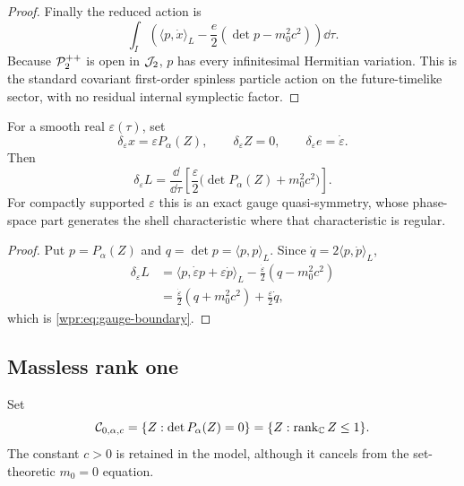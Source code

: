 \begin{proof}
Finally the reduced action is
\[
 \int_I\left(\langle p,\dot x\rangle_L
 -\frac e2(\det p-m_0^2c^2)\right)\dd\tau.
\]
Because \(\mathcal P_2^{++}\) is open in \(\mathcal J_2\), \(p\) has every infinitesimal
Hermitian variation.  This is the standard covariant first-order
spinless particle action on the future-timelike sector, with no
residual internal symplectic factor.
\end{proof}

\begin{proposition}
\label{wpr:prop:gauge}
For a smooth real \(\varepsilon(\tau)\), set
\[
 \delta_\varepsilon x=\varepsilon P_\alpha(Z),\qquad
 \delta_\varepsilon Z=0,\qquad
 \delta_\varepsilon e=\dot\varepsilon.
\]
Then
\begin{equation}
 \delta_\varepsilon L
 =
 \frac{\dd}{\dd\tau}
 \left[
 \frac{\varepsilon}{2}
 \bigl(\det P_\alpha(Z)+m_0^2c^2\bigr)
 \right].
 \label{wpr:eq:gauge-boundary}
\end{equation}
For compactly supported \(\varepsilon\) this is an exact gauge
quasi-symmetry, whose phase-space part generates the shell
characteristic where that characteristic is regular.
\end{proposition}
\begin{proof}
Put \(p=P_\alpha(Z)\) and \(q=\det p=\langle p,p\rangle_L\).  Since
\(\dot q=2\langle p,\dot p\rangle_L\),
\begin{align*}
 \delta_\varepsilon L
 &=
 \langle p,\dot\varepsilon p+\varepsilon\dot p\rangle_L
 -\frac{\dot\varepsilon}{2}(q-m_0^2c^2)\\
 &=
 \frac{\dot\varepsilon}{2}(q+m_0^2c^2)
 +\frac{\varepsilon}{2}\dot q,
\end{align*}
which is \eqref{wpr:eq:gauge-boundary}.
\end{proof}


\subsection{Massless rank one}
Set
\[
 \mathcal C_{0,\alpha,c}
 =\{Z:\det P_\alpha(Z)=0\}
 =\{Z:\operatorname{rank}_{\mathbb C} Z\leq1\}.
\]
The constant \(c>0\) is retained in the model, although it cancels
from the set-theoretic \(m_0=0\) equation.

